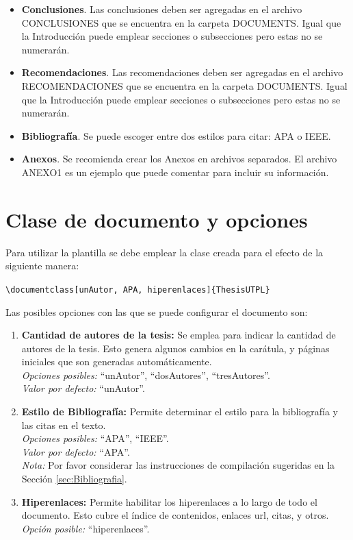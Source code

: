 \begin{itemize}
	\item \textbf{Conclusiones}. Las conclusiones deben ser agregadas en el archivo CONCLUSIONES que se encuentra en la carpeta DOCUMENTS. Igual que la Introducción puede emplear secciones o subsecciones pero estas no se numerarán.  
	\item \textbf{Recomendaciones}. Las recomendaciones deben ser agregadas en el archivo RECOMENDACIONES que se encuentra en la carpeta DOCUMENTS. Igual que la Introducción puede emplear secciones o subsecciones pero estas no se numerarán.   	
	\item \textbf{Bibliografía}. Se puede escoger entre dos estilos para citar: APA o IEEE.
	\item \textbf{Anexos}. Se recomienda crear los Anexos en archivos separados. El archivo ANEXO1 es un ejemplo que puede comentar para incluir su información.   
\end{itemize}

\section{Clase de documento y opciones}

Para utilizar la plantilla se debe emplear la clase creada para el efecto de la siguiente manera: 

\lstinline|\documentclass[unAutor, APA, hiperenlaces]{ThesisUTPL}| 

Las posibles opciones con las que se puede configurar el documento son: 

\begin{enumerate}
	\item \textbf{Cantidad de autores de la tesis:} Se emplea para indicar la cantidad de autores de la tesis. Esto genera algunos cambios en la carátula, y páginas iniciales que son generadas automáticamente. \\
	\textit{Opciones posibles:} ``unAutor'', ``dosAutores'', ``tresAutores''. \\
	\textit{Valor por defecto:} ``unAutor''.
	\item \textbf{Estilo de Bibliografía:} Permite determinar el estilo para la bibliografía y las citas en el texto. \\
	\textit{Opciones posibles:} ``APA'', ``IEEE''.\\
	\textit{Valor por defecto:} ``APA''. \\
	\textit{Nota:} Por favor considerar las instrucciones de compilación sugeridas en la Sección \ref{sec:Bibliografia}.
	
	\item \textbf{Hiperenlaces:} Permite habilitar los hiperenlaces a lo largo de todo el documento. Esto cubre el índice de contenidos, enlaces url, citas, y otros. \\
	\textit{Opción posible:} ``hiperenlaces''. 
	
\end{enumerate}

